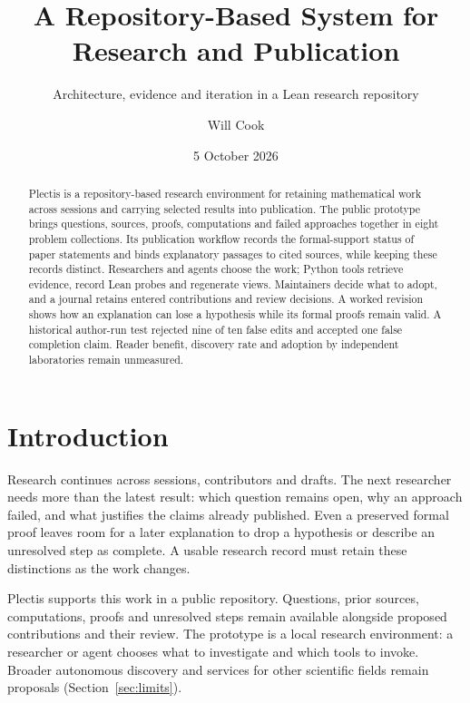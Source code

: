 \documentclass[10pt]{article}
\title{A Repository-Based System for Research and Publication}
\subtitle{Architecture, evidence and iteration in a Lean research repository}
\author{Will Cook}
\date{5 October 2026}
\newcommand{\HistoricalEdits}{ten}
\newcommand{\HistoricalRejected}{nine}
\begin{document}
\maketitle
\paperprovenance
\begin{abstract}
Plectis is a repository-based research environment for retaining mathematical work across sessions and carrying selected results into publication.
The public prototype brings questions, sources, proofs, computations and failed approaches together in eight problem collections.
Its publication workflow records the formal-support status of paper statements and binds explanatory passages to cited sources, while keeping these records distinct.
Researchers and agents choose the work; Python tools retrieve evidence, record Lean probes and regenerate views. Maintainers decide what to adopt, and a journal retains entered contributions and review decisions.
A worked revision shows how an explanation can lose a hypothesis while its formal proofs remain valid.
A historical author-run test rejected \HistoricalRejected{} of \HistoricalEdits{} false edits and accepted one false completion claim. Reader benefit, discovery rate and adoption by independent laboratories remain unmeasured.
\end{abstract}
\section{Introduction}\label{sec:intro}
Research continues across sessions, contributors and drafts. The next researcher needs more than the latest result: which question remains open, why an approach failed, and what justifies the claims already published. Even a preserved formal proof leaves room for a later explanation to drop a hypothesis or describe an unresolved step as complete. A usable research record must retain these distinctions as the work changes.

Plectis supports this work in a public repository. Questions, prior sources, computations, proofs and unresolved steps remain available alongside proposed contributions and their review. The prototype is a local research environment: a researcher or agent chooses what to investigate and which tools to invoke. Broader autonomous discovery and services for other scientific fields remain proposals (Section~\ref{sec:limits}).
\end{document}
